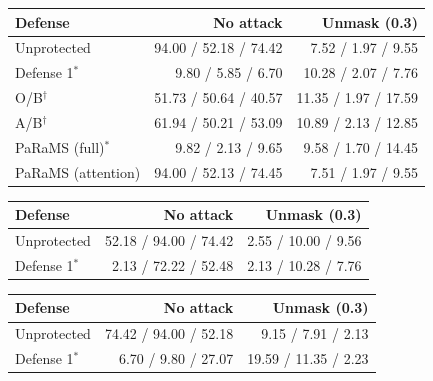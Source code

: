 \begin{tabular}{lrr}
\toprule
Defense & No attack & Unmask (0.3) \\
\midrule
Unprotected & 94.00 / 52.18 / 74.42 & 7.52 / 1.97 / 9.55 \\
Defense 1$^{*}$ & 9.80 / 5.85 / 6.70 & 10.28 / 2.07 / 7.76 \\
O/B$^{\dagger}$ & 51.73 / 50.64 / 40.57 & 11.35 / 1.97 / 17.59 \\
A/B$^{\dagger}$ & 61.94 / 50.21 / 53.09 & 10.89 / 2.13 / 12.85 \\
PaRaMS (full)$^{*}$ & 9.82 / 2.13 / 9.65 & 9.58 / 1.70 / 14.45 \\
PaRaMS (attention) & 94.00 / 52.13 / 74.45 & 7.51 / 1.97 / 9.55 \\
\bottomrule
\end{tabular}

\begin{tabular}{lrr}
\toprule
Defense & No attack & Unmask (0.3) \\
\midrule
Unprotected & 52.18 / 94.00 / 74.42 & 2.55 / 10.00 / 9.56 \\
Defense 1$^{*}$ & 2.13 / 72.22 / 52.48 & 2.13 / 10.28 / 7.76 \\
\bottomrule
\end{tabular}

\begin{tabular}{lrr}
\toprule
Defense & No attack & Unmask (0.3) \\
\midrule
Unprotected & 74.42 / 94.00 / 52.18 & 9.15 / 7.91 / 2.13 \\
Defense 1$^{*}$ & 6.70 / 9.80 / 27.07 & 19.59 / 11.35 / 2.23 \\
\bottomrule
\end{tabular}


